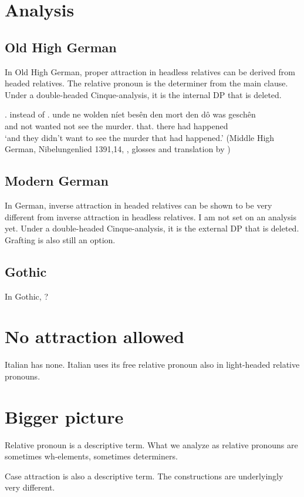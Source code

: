   \section{Analysis}

    \subsection{Old High German}
In Old High German, proper attraction in headless relatives can be derived from headed relatives. The relative pronoun is the determiner from the main clause. Under a double-headed Cinque-analysis, it is the internal DP that is deleted.




\ex.  instead of 
\ag. unde ne wolden níet besên den mort den dô was geschên\\
 and not wanted not see the murder. that. there had happened\\
 `and they didn't want to see the murder that had happened.' \hfill (Middle High German, Nibelungenlied 1391,14, \citealt[756]{behaghel1923}, glosses and translation by \citealt[198]{pittner1995})



    \subsection{Modern German}
In German, inverse attraction in headed relatives can be shown to be very different from inverse attraction in headless relatives. I am not set on an analysis yet. Under a double-headed Cinque-analysis, it is the external DP that is deleted. Grafting is also still an option.


    \subsection{Gothic}
In Gothic, ?



\section{No attraction allowed}
Italian has none. Italian uses its free relative pronoun also in light-headed relative pronouns.


  \section{Bigger picture}
Relative pronoun is a descriptive term. What we analyze as relative pronouns are sometimes wh-elements, sometimes determiners.

Case attraction is also a descriptive term. The constructions are underlyingly very different.
